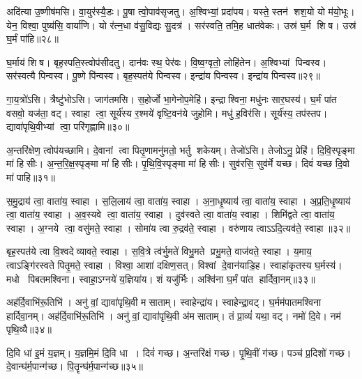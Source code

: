 अदि॑त्या उ॒ष्णीष॑मसि। 
वा॒युर॑स्यै॒डः। 
पू॒षा त्वो॒पाव॑सृजतु। 
अ॒श्विभ्यां॒ प्रदा॑पय। 
यस्ते॒ स्तन॑ शश॒यो यो म॑यो॒भूः। 
येन॒ विश्वा॒ पुष्य॑सि॒ वार्या॑णि। 
यो र॑त्न॒धा व॑सु॒विद्यः सु॒दत्र॑। 
सर॑स्वति॒ तमि॒ह धात॑वेकः। 
उस्र॑ घ॒र्म शिष। 
उस्र॑ घ॒र्मं पा॑हि॥२८॥

घ॒र्माय॑ शिष। 
बृह॒स्पति॒स्त्वोप॑सीदतु। 
दान॑वः स्थ॒ पेर॑वः। 
वि॒ष्व॒ग्वृतो॒ लोहि॑तेन। 
अ॒श्विभ्यां पिन्वस्व। 
सर॑स्वत्यै पिन्वस्व। 
पू॒ष्णे पि॑न्वस्व। 
बृह॒स्पत॑ये पिन्वस्व। 
इन्द्रा॑य पिन्वस्व। 
इन्द्रा॑य पिन्वस्व॥२९॥

गा॒य॒त्रो॑ऽसि। 
त्रैष्टु॑भोऽसि। 
जाग॑तमसि। 
स॒होर्जो भा॒गेनोप॒मेहि॑। 
इन्द्राश्विना॒ मधु॑नः सार॒घस्य॑। 
घ॒र्मं पा॑त वसवो॒ यज॑ता॒ वट्। 
स्वाहा त्वा॒ सूर्य॑स्य र॒श्मये॑ वृष्टि॒वन॑ये जुहोमि। 
मधु॑ ह॒विर॑सि। 
सूर्य॑स्य॒ तप॑स्तप। 
द्यावा॑पृथि॒वीभ्यां त्वा॒ परि॑गृह्णामि॥३०॥

अ॒न्तरि॑क्षेण॒ त्वोप॑यच्छामि। 
दे॒वानां त्वा पितृ॒णामनु॑मतो॒ भर्तु शकेयम्। 
तेजो॑ऽसि। 
तेजोऽनु॒ प्रेहि॑। 
दि॒वि॒स्पृङ्मा मा॑ हिसीः। 
अ॒न्त॒रि॒क्ष॒स्पृङ्मा मा॑ हिसीः। 
पृ॒थि॒वि॒स्पृङ्मा मा॑ हिसीः। 
सुव॑रसि॒ सुव॑र्मे यच्छ। 
दिवं॑ यच्छ दि॒वो मा॑ पाहि॥३१॥
\anuvakamend[एहि॑ पाहि पिन्वस्व गृह्णामि॒ नव॑ च]

स॒मु॒द्राय॑ त्वा॒ वाता॑य॒ स्वाहा। 
स॒लि॒लाय॑ त्वा॒ वाता॑य॒ स्वाहा। 
अ॒ना॒धृ॒ष्याय॑ त्वा॒ वाता॑य॒ स्वाहा। 
अ॒प्र॒ति॒धृ॒ष्याय॑ त्वा॒ वाता॑य॒ स्वाहा। 
अ॒व॒स्यवे त्वा॒ वाता॑य॒ स्वाहा। 
दुव॑स्वते त्वा॒ वाता॑य॒ स्वाहा। 
शिमि॑द्वते त्वा॒ वाता॑य॒ स्वाहा। 
अ॒ग्नये त्वा॒ वसु॑मते॒ स्वाहा। 
सोमा॑य त्वा रु॒द्रव॑ते॒ स्वाहा। 
वरु॑णाय त्वाऽऽदि॒त्यव॑ते॒ स्वाहा॥३२॥

बृह॒स्पत॑ये त्वा वि॒श्वदेव्यावते॒ स्वाहा। 
स॒वि॒त्रे त्व॑र्भु॒मते॑ विभु॒मते प्रभु॒मते॒ वाज॑वते॒ स्वाहा। 
य॒माय॒ त्वाऽङ्गि॑रस्वते पितृ॒मते॒ स्वाहा। 
विश्वा॒ आशा॑ दक्षिण॒सत्। 
विश्वां दे॒वान॑याडि॒ह। 
स्वाहा॑कृतस्य घ॒र्मस्य॑। 
मधो पिबतमश्विना। 
स्वाहा॒ऽग्नये॑ य॒ज्ञिया॑य। 
शं यजु॑र्भिः। 
अश्वि॑ना घ॒र्मं पा॑त हार्दिवा॒नम्॥३३॥

अह॑र्दि॒वाभि॑रू॒तिभि॑। 
अनु॑ वां॒ द्यावा॑पृथि॒वी मसाताम्। 
स्वाहेन्द्रा॑य। 
स्वाहेन्द्रा॒वट्। 
घ॒र्मम॑पातमश्विना हार्दिवा॒नम्। 
अह॑र्दि॒वाभि॑रू॒तिभि॑। 
अनु॑ वां॒ द्यावा॑पृथि॒वी अ॑मसाताम्। 
तं प्रा॒व्यं॑ यथा॒ वट्। 
नमो॑ दि॒वे। 
नम॑ पृथि॒व्यै॥३४॥

दि॒वि धा॑ इ॒मं य॒ज्ञम्। 
य॒ज्ञमि॒मं दि॒वि धा। 
दिवं॑ गच्छ। 
अ॒न्तरि॑क्षं गच्छ। 
पृ॒थि॒वीं ग॑च्छ। 
पञ्च॑ प्र॒दिशो॑ गच्छ। 
दे॒वान्घ॑र्म॒पान्ग॑च्छ। 
पि॒तॄन्घ॑र्म॒पान्ग॑च्छ॥३५॥
\anuvakamend[आ॒दि॒त्यव॑ते॒ स्वाहा॑ हार्दिवा॒नं पृ॑थि॒व्या अ॒ष्टौ च॑]

